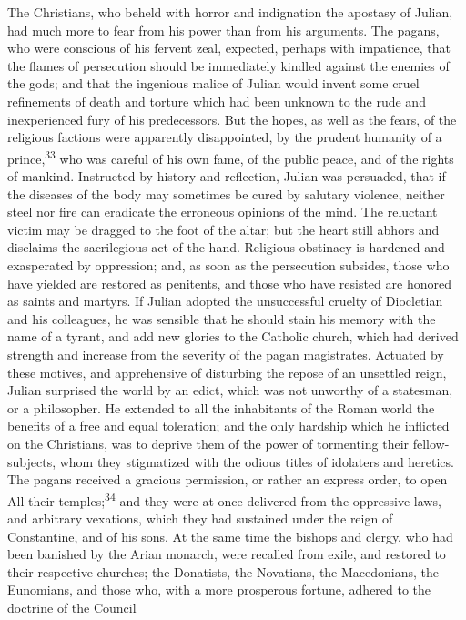 The Christians, who beheld with horror and indignation the
apostasy of Julian, had much more to fear from his power than
from his arguments. The pagans, who were conscious of his fervent
zeal, expected, perhaps with impatience, that the flames of
persecution should be immediately kindled against the enemies of
the gods; and that the ingenious malice of Julian would invent
some cruel refinements of death and torture which had been
unknown to the rude and inexperienced fury of his predecessors.
But the hopes, as well as the fears, of the religious factions
were apparently disappointed, by the prudent humanity of a
prince,\textsuperscript{33} who was careful of his own fame, of the public peace,
and of the rights of mankind. Instructed by history and
reflection, Julian was persuaded, that if the diseases of the
body may sometimes be cured by salutary violence, neither steel
nor fire can eradicate the erroneous opinions of the mind. The
reluctant victim may be dragged to the foot of the altar; but the
heart still abhors and disclaims the sacrilegious act of the
hand. Religious obstinacy is hardened and exasperated by
oppression; and, as soon as the persecution subsides, those who
have yielded are restored as penitents, and those who have
resisted are honored as saints and martyrs. If Julian adopted the
unsuccessful cruelty of Diocletian and his colleagues, he was
sensible that he should stain his memory with the name of a
tyrant, and add new glories to the Catholic church, which had
derived strength and increase from the severity of the pagan
magistrates. Actuated by these motives, and apprehensive of
disturbing the repose of an unsettled reign, Julian surprised the
world by an edict, which was not unworthy of a statesman, or a
philosopher. He extended to all the inhabitants of the Roman
world the benefits of a free and equal toleration; and the only
hardship which he inflicted on the Christians, was to deprive
them of the power of tormenting their fellow-subjects, whom they
stigmatized with the odious titles of idolaters and heretics. The
pagans received a gracious permission, or rather an express
order, to open All their temples;\textsuperscript{34} and they were at once
delivered from the oppressive laws, and arbitrary vexations,
which they had sustained under the reign of Constantine, and of
his sons. At the same time the bishops and clergy, who had been
banished by the Arian monarch, were recalled from exile, and
restored to their respective churches; the Donatists, the
Novatians, the Macedonians, the Eunomians, and those who, with a
more prosperous fortune, adhered to the doctrine of the Council
